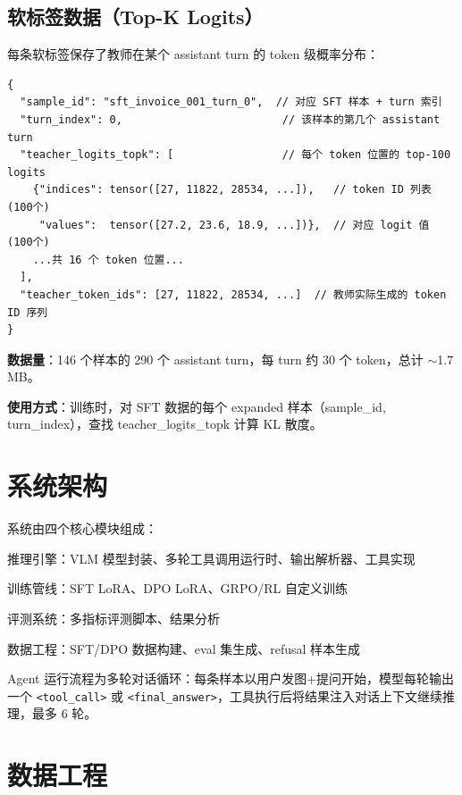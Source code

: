 \documentclass[12pt,a4paper]{ctexart}
\begin{document}
\subsection{软标签数据（Top-K Logits）}

每条软标签保存了教师在某个 assistant turn 的 token 级概率分布：

\begin{lstlisting}
{
  "sample_id": "sft_invoice_001_turn_0",  // 对应 SFT 样本 + turn 索引
  "turn_index": 0,                         // 该样本的第几个 assistant turn
  "teacher_logits_topk": [                 // 每个 token 位置的 top-100 logits
    {"indices": tensor([27, 11822, 28534, ...]),   // token ID 列表 (100个)
     "values":  tensor([27.2, 23.6, 18.9, ...])},  // 对应 logit 值 (100个)
    ...共 16 个 token 位置...
  ],
  "teacher_token_ids": [27, 11822, 28534, ...]  // 教师实际生成的 token ID 序列
}
\end{lstlisting}

\textbf{数据量}：146 个样本的 290 个 assistant turn，每 turn 约 30 个 token，总计 $\sim$1.7 MB。

\textbf{使用方式}：训练时，对 SFT 数据的每个 expanded 样本（sample\_id, turn\_index），查找 teacher\_logits\_topk 计算 KL 散度。

\section{系统架构}

系统由四个核心模块组成：

\begin{description}[nosep]
  \item[\texttt{agent/}] 推理引擎：VLM 模型封装、多轮工具调用运行时、输出解析器、工具实现
  \item[\texttt{train/}] 训练管线：SFT LoRA、DPO LoRA、GRPO/RL 自定义训练
  \item[\texttt{eval/}] 评测系统：多指标评测脚本、结果分析
  \item[\texttt{scripts/}] 数据工程：SFT/DPO 数据构建、eval 集生成、refusal 样本生成
\end{description}

Agent 运行流程为多轮对话循环：每条样本以用户发图+提问开始，模型每轮输出一个 \texttt{<tool\_call>} 或 \texttt{<final\_answer>}，工具执行后将结果注入对话上下文继续推理，最多 6 轮。

\section{数据工程}
\end{document}
